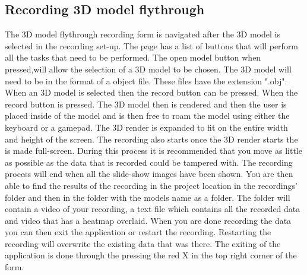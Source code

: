 \subsection{Recording 3D model flythrough}
The 3D model flythrough recording form is navigated after the 3D model is selected in the recording set-up. The page has a list of buttons that will perform all the tasks that need to be performed. The open model button when pressed,will allow the selection of a 3D model to be chosen. The 3D model will need to be in the format of a object file. These files have the extension ".obj". When an 3D model is selected then the record button can be pressed. When the record button is pressed. The 3D model then is rendered and then the user is placed inside of the model and is then free to roam the model using either the keyboard or a gamepad. The 3D render is expanded to fit on the entire width and height of the screen. The recording also starts once the 3D render starts the is made full-screen. During this process it is recommended that you move as little as possible as the data that is recorded could be tampered with. The recording process will end when all the slide-show images have been shown. You are then able to find the results of the recording in the project location in the recordings' folder and then in the folder with the models name as a folder. The folder will contain a video of your recording, a text file which contains all the recorded data and video that has a heatmap overlaid. When you are done recording the data you can then exit the application or restart the recording. Restarting the recording will overwrite the existing data that was there. The exiting of the application is done through the pressing the red X in the top right corner of the form.

